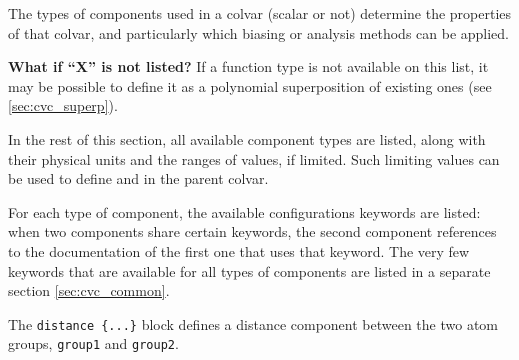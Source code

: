 The types of components used in a colvar (scalar or not) determine the
properties of that colvar, and particularly which biasing or analysis methods
can be applied.

\textbf{What if ``X'' is not listed?} If a function type is not available on this list, it may be possible to define it as a polynomial superposition of existing ones (see \ref{sec:cvc_superp}).

In the rest of this section, all available component types are listed, along with their physical units and the ranges of values, if limited.
Such limiting values can be used to define  and  in the parent colvar.

For each type of component, the available configurations keywords are listed:
when two components share certain keywords, the second component references to
the documentation of the first one that uses that keyword.
The very few keywords that are available for all types of components are listed in a separate section \ref{sec:cvc_common}.





The \texttt{distance \{...\}} block defines a distance component between the two atom groups, \texttt{group1} and \texttt{group2}.

